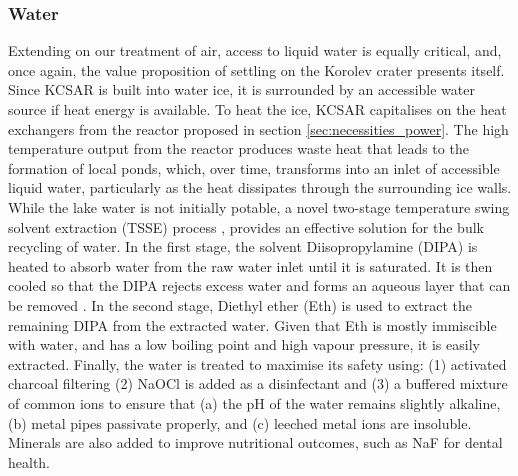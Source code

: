 \documentclass[fleqn,10pt]{Stylesheet} %
\begin{document}
\subsubsection{Water}
\label{sec:necessities_water}

Extending on our treatment of air, access to liquid water is equally critical, and, once again, the value proposition of settling on the Korolev crater presents itself. Since KCSAR is built into water ice, it is surrounded by an accessible water source if heat energy is available. To heat the ice, KCSAR capitalises on the heat exchangers from the reactor proposed in section \ref{sec:necessities_power}. The high temperature output from the reactor produces waste heat that leads to the formation of local ponds, which, over time, transforms into an inlet of accessible liquid water, particularly as the heat dissipates through the surrounding ice walls. While the lake water is not initially potable, a novel two-stage temperature swing solvent extraction (TSSE) process \cite{ChanheeBoo2019}, provides an effective solution for the bulk recycling of water. In the first stage, the solvent Diisopropylamine (DIPA) is heated to absorb water from the raw water inlet until it is saturated. It is then cooled so that the DIPA rejects excess water and forms an aqueous layer that can be removed \cite{CRC_84Ed}. In the second stage, Diethyl ether (Eth) is used to extract the remaining DIPA from the extracted water. Given that Eth is mostly immiscible with water, and has a low boiling point and high vapour pressure, it is easily extracted. Finally, the water is treated to maximise its safety using: (1) activated charcoal filtering (2) NaOCl is added as a disinfectant and (3) a buffered mixture of common ions to ensure that (a) the pH of the water remains slightly alkaline, (b) metal pipes passivate properly, and (c) leeched metal ions are insoluble. Minerals are also added to improve nutritional outcomes, such as NaF for dental health.
\end{document}
